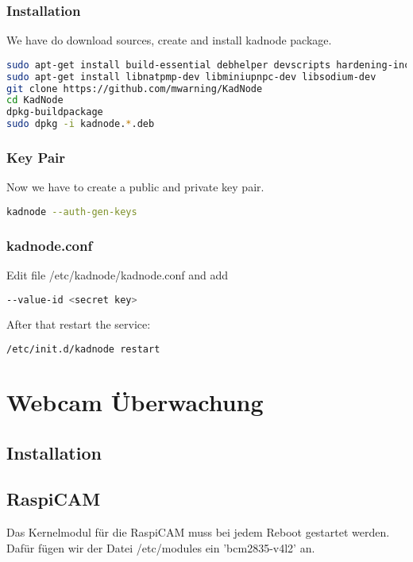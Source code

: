 \documentclass[german,a4paper,11pt]{report}
\begin{document}
\subsection{Installation}
We have do download sources, create and install kadnode package.

\begin{lstlisting}[language=bash,caption={install kadnode}]
sudo apt-get install build-essential debhelper devscripts hardening-includes
sudo apt-get install libnatpmp-dev libminiupnpc-dev libsodium-dev
git clone https://github.com/mwarning/KadNode
cd KadNode
dpkg-buildpackage
sudo dpkg -i kadnode.*.deb
\end{lstlisting}

\subsection{Key Pair}

Now we have to create a public and private key pair.
\begin{lstlisting}[language=bash,caption={kadnode key pair}]
kadnode --auth-gen-keys
\end{lstlisting}

\subsection{kadnode.conf}

Edit file /etc/kadnode/kadnode.conf and add
\begin{lstlisting}[language=bash,caption={/etc/kadnode/kadnode.conf}]
--value-id <secret key>
\end{lstlisting}
After that restart the service:
\begin{lstlisting}[language=bash,caption={}]
/etc/init.d/kadnode restart
\end{lstlisting}

\chapter{Webcam Überwachung}
\section{Installation}
\section{RaspiCAM}
Das Kernelmodul für die RaspiCAM muss bei jedem Reboot gestartet werden.
Dafür fügen wir der Datei /etc/modules ein 'bcm2835-v4l2' an.
\end{document}

